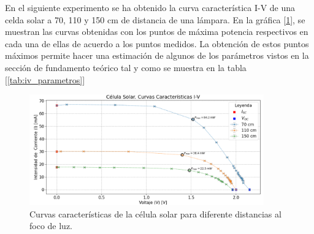 \vspace{\baselineskip}

En el siguiente experimento se ha obtenido la curva característica $\text{I-V}$ de una celda solar a 70, 110 y 150 cm de distancia de una lámpara. En la gráfica [\ref{fig:curvas_caracteristicas}], se muestran las curvas obtenidas con los puntos de máxima potencia respectivos en cada una de ellas de acuerdo a los puntos medidos. La obtención de estos puntos máximos permite hacer una estimación de algunos de los parámetros vistos en la sección de fundamento teórico tal y como se muestra en la tabla [\ref{tab:iv_parametros}]

\vspace{\baselineskip}

\begin{figure}[H]
	\centering
	\includegraphics[width=0.9\textwidth]{grafico03_curvas_caracteristicas_celula_solar}
	\caption{Curvas características de la célula solar para diferente distancias al foco de luz.}
	\label{fig:curvas_caracteristicas}
\end{figure}



\begin{table}[H]
	\centering
	\caption{Datos de caracterización de las curvar I-V. Área del panel solar A = 50 cm$^2$.}
	\label{tab:iv_parametros}
\end{table}


